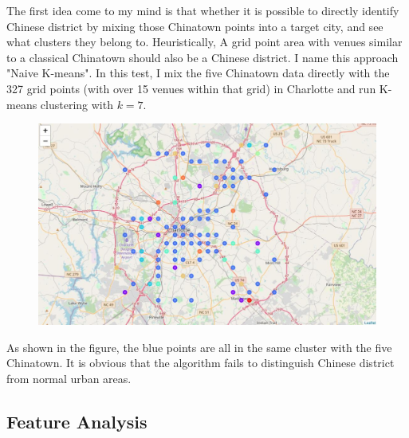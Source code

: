 \documentclass{article}
\begin{document}
The first idea come to my mind is that whether it is possible to directly identify Chinese district by mixing those Chinatown points into a target city, and see what clusters they belong to.
Heuristically, A grid point area with venues similar to a classical Chinatown should also be a Chinese district.
I name this approach "Naive K-means".
In this test, I mix the five Chinatown data directly with the 327 grid points (with over 15 venues within that grid) in Charlotte and run K-means clustering with $k=7$.

\begin{figure}[h!]
\includegraphics[width=1.0\textwidth]{cn1.jpg}
\centering
\end{figure}

As shown in the figure, the blue points are all in the same cluster with the five Chinatown.
It is obvious that the algorithm fails to distinguish Chinese district from normal urban areas.

\newpage

\subsection{Feature Analysis}
\end{document}
